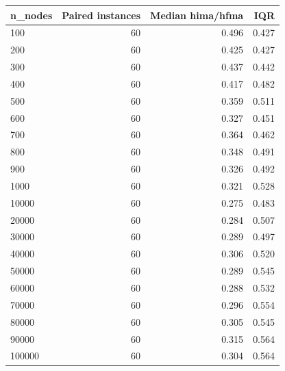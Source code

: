 \begin{tabular}{lrrr}
\toprule
n\_nodes & Paired instances & Median hima/hfma & IQR \\
\midrule
100 & 60 & 0.496 & 0.427 \\
200 & 60 & 0.425 & 0.427 \\
300 & 60 & 0.437 & 0.442 \\
400 & 60 & 0.417 & 0.482 \\
500 & 60 & 0.359 & 0.511 \\
600 & 60 & 0.327 & 0.451 \\
700 & 60 & 0.364 & 0.462 \\
800 & 60 & 0.348 & 0.491 \\
900 & 60 & 0.326 & 0.492 \\
1000 & 60 & 0.321 & 0.528 \\
10000 & 60 & 0.275 & 0.483 \\
20000 & 60 & 0.284 & 0.507 \\
30000 & 60 & 0.289 & 0.497 \\
40000 & 60 & 0.306 & 0.520 \\
50000 & 60 & 0.289 & 0.545 \\
60000 & 60 & 0.288 & 0.532 \\
70000 & 60 & 0.296 & 0.554 \\
80000 & 60 & 0.305 & 0.545 \\
90000 & 60 & 0.315 & 0.564 \\
100000 & 60 & 0.304 & 0.564 \\
\bottomrule
\end{tabular}
